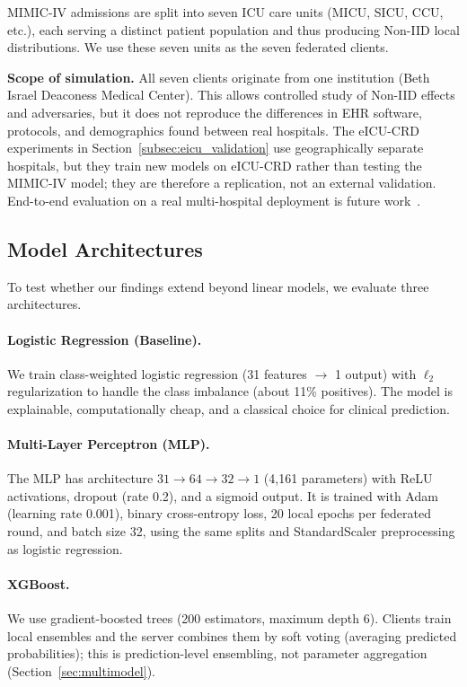 \documentclass[journal]{IEEEtran}
\begin{document}
MIMIC-IV admissions are split into seven ICU care units (MICU, SICU, CCU, etc.), each serving a distinct patient population and thus producing Non-IID local distributions. We use these seven units as the seven federated clients.

\textbf{Scope of simulation.} All seven clients originate from one institution (Beth Israel Deaconess Medical Center). This allows controlled study of Non-IID effects and adversaries, but it does not reproduce the differences in EHR software, protocols, and demographics found between real hospitals. The eICU-CRD experiments in Section~\ref{subsec:eicu_validation} use geographically separate hospitals, but they train new models on eICU-CRD rather than testing the MIMIC-IV model; they are therefore a replication, not an external validation. End-to-end evaluation on a real multi-hospital deployment is future work~\cite{nishio2019client}.

\subsection{Model Architectures}

To test whether our findings extend beyond linear models, we evaluate three architectures.

\paragraph{Logistic Regression (Baseline).}
We train class-weighted logistic regression (31 features $\rightarrow$ 1 output) with $\ell_2$ regularization to handle the class imbalance (about 11\% positives). The model is explainable, computationally cheap, and a classical choice for clinical prediction.

\paragraph{Multi-Layer Perceptron (MLP).}
The MLP has architecture $31 \rightarrow 64 \rightarrow 32 \rightarrow 1$ (4,161 parameters) with ReLU activations, dropout (rate 0.2), and a sigmoid output. It is trained with Adam (learning rate 0.001), binary cross-entropy loss, 20 local epochs per federated round, and batch size 32, using the same splits and StandardScaler preprocessing as logistic regression.

\paragraph{XGBoost.}
We use gradient-boosted trees (200 estimators, maximum depth 6). Clients train local ensembles and the server combines them by soft voting (averaging predicted probabilities); this is prediction-level ensembling, not parameter aggregation (Section~\ref{sec:multimodel}).
\end{document}
